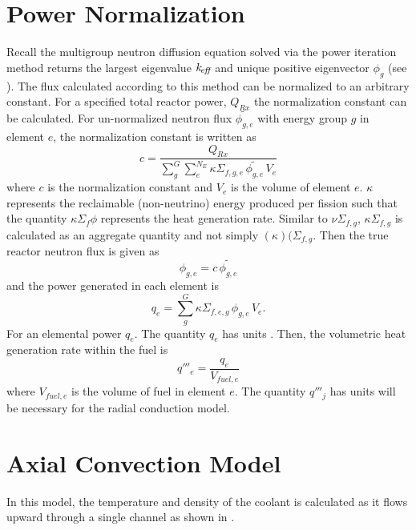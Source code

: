 \section{Power Normalization}
  Recall the multigroup neutron diffusion equation solved via the power
  iteration method returns the largest eigenvalue $k_{\!\mbox{\scriptsize \em eff}}$ and unique positive
  eigenvector $\phi_g$ (see ). The flux calculated
  according to this method can be normalized to an arbitrary constant. For a
  specified total reactor power, $Q_{Rx}$ the normalization constant can be 
  calculated. For un-normalized neutron flux $\widetilde{\phi_{g,e}}$ with
  energy group $g$ in element $e$, the normalization constant is written as
  \begin{equation}
    \label{eq:normalization_c}
    c = \frac{Q_{Rx}}{\sum_{g}^{G} \sum_{e}^{N_E} \kappa \Sigma_{f,g,e} \,
      \widetilde{\phi_{g,e}} \, V_e}
  \end{equation}
  where $c$ is the normalization constant and $V_e$ is the volume of element
  $e$. $\kappa$ represents the reclaimable
  (non-neutrino) energy produced per fission such that the quantity $\kappa
  \Sigma_f \phi$ represents the heat generation rate. Similar to
  $\nu\Sigma_{f,g}$, $\kappa\Sigma_{f,g}$ is calculated as an aggregate
  quantity and not simply $(\kappa)(\Sigma_{f,g}$. Then the true reactor
  neutron flux is given as
  \begin{equation}
    \label{eq:normalization_phi}
    \phi_{g,e} = c \, \widetilde{\phi_{g,e}}
  \end{equation}
  and the power generated in each element is 
  \begin{equation}
    \label{eq:elementpwr}
    q_{e} = \sum_g^G \kappa \Sigma_{f,e,g} \, \phi_{g,e} \, V_e .
  \end{equation}
  For an elemental power $q_e$. The quantity $q_e$ has units . Then,
  the volumetric heat generation rate within the fuel is 
  \begin{equation}
    \label{eq:elementqppp_fuel}
    q'''_{e} = \frac{q_e}{V_{fuel,e}}
  \end{equation}
  where $V_{fuel,e}$ is the volume of fuel in element $e$. The quantity $q'''_j$
  has units  will be necessary for the 
  radial conduction model.


\section{Axial Convection Model}
  \label{sec:axial_convection_model}
  In this model, the temperature and density of the coolant is calculated as
  it flows upward through a single channel as shown in
  .

